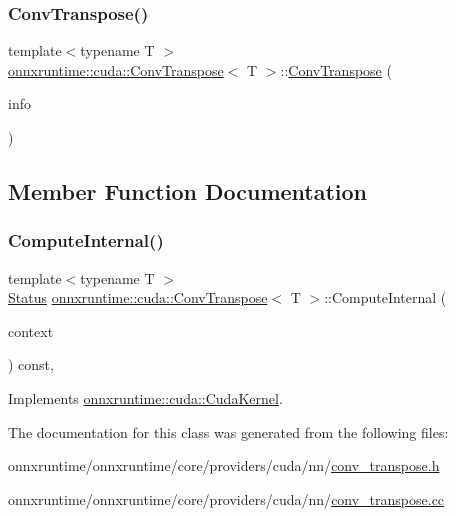 \subsubsection{\texorpdfstring{Conv\+Transpose()}{ConvTranspose()}}
{\footnotesize\ttfamily template$<$typename T $>$ \\
\mbox{\hyperlink{classonnxruntime_1_1cuda_1_1ConvTranspose}{onnxruntime\+::cuda\+::\+Conv\+Transpose}}$<$ T $>$\+::\mbox{\hyperlink{classonnxruntime_1_1cuda_1_1ConvTranspose}{Conv\+Transpose}} (\begin{DoxyParamCaption}\item[{const \mbox{\hyperlink{classonnxruntime_1_1OpKernelInfo}{Op\+Kernel\+Info}} \&}]{info }\end{DoxyParamCaption})\hspace{0.3cm}{\ttfamily [inline]}}



\subsection{Member Function Documentation}
\mbox{\label{classonnxruntime_1_1cuda_1_1ConvTranspose_a90953955a478cce3bc4e2992cb0e32d8}} 
\subsubsection{\texorpdfstring{Compute\+Internal()}{ComputeInternal()}}
{\footnotesize\ttfamily template$<$typename T $>$ \\
\mbox{\hyperlink{classonnxruntime_1_1common_1_1Status}{Status}} \mbox{\hyperlink{classonnxruntime_1_1cuda_1_1ConvTranspose}{onnxruntime\+::cuda\+::\+Conv\+Transpose}}$<$ T $>$\+::Compute\+Internal (\begin{DoxyParamCaption}\item[{\mbox{\hyperlink{classonnxruntime_1_1OpKernelContext}{Op\+Kernel\+Context}} $\ast$}]{context }\end{DoxyParamCaption}) const\hspace{0.3cm}{\ttfamily [override]}, {\ttfamily [virtual]}}



Implements \mbox{\hyperlink{classonnxruntime_1_1cuda_1_1CudaKernel_aca7af04ae448017d6023d30bba231ebb}{onnxruntime\+::cuda\+::\+Cuda\+Kernel}}.



The documentation for this class was generated from the following files\+:\begin{DoxyCompactItemize}
\item 
onnxruntime/onnxruntime/core/providers/cuda/nn/\mbox{\hyperlink{cuda_2nn_2conv__transpose_8h}{conv\+\_\+transpose.\+h}}\item 
onnxruntime/onnxruntime/core/providers/cuda/nn/\mbox{\hyperlink{cuda_2nn_2conv__transpose_8cc}{conv\+\_\+transpose.\+cc}}\end{DoxyCompactItemize}
